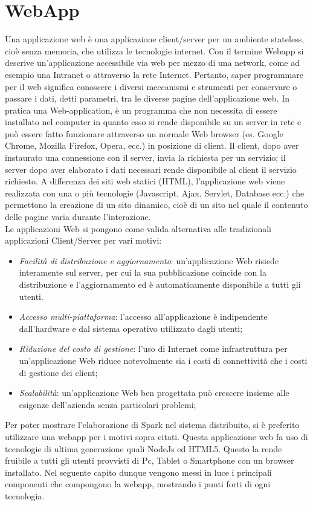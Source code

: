 \section{WebApp}
\label{sec:webapp}
Una applicazione web è una applicazione client/server per un ambiente stateless, cioè senza memoria, che utilizza le tecnologie internet. Con il termine Webapp si descrive un'applicazione accessibile via web per mezzo di una network, come ad esempio una Intranet o attraverso la rete Internet. Pertanto, saper programmare per il web significa conoscere i diversi meccanismi e strumenti per conservare o passare i dati, detti parametri, tra le diverse pagine dell'applicazione web. In pratica una Web-application, è un programma che non necessita di essere installato nel computer in quanto esso si rende disponibile su un server in rete e può essere fatto funzionare attraverso un normale Web browser (es. Google Chrome, Mozilla Firefox, Opera, ecc.) in posizione di client. Il client, dopo aver instaurato una connessione con il server, invia la richiesta per un servizio; il server dopo aver elaborato i dati necessari rende disponibile al client il servizio richiesto. A differenza dei siti web statici (HTML), l'applicazione web viene realizzata con una o più tecnologie (Javascript, Ajax, Servlet, Database ecc.) che permettono la creazione di un sito dinamico, cioè di un sito nel quale il contenuto delle pagine varia durante l'interazione.
\\Le applicazioni Web si pongono come valida alternativa alle tradizionali applicazioni Client/Server per vari motivi:
\begin{itemize}
\item \textit{Facilità di distribuzione e aggiornamento}: un'applicazione Web risiede interamente sul server, per cui la sua pubblicazione coincide con la distribuzione e l'aggiornamento ed è automaticamente disponibile a tutti gli utenti.
\item \textit{Accesso multi-piattaforma}: l'accesso all'applicazione è indipendente dall'hardware e dal sistema operativo utilizzato dagli utenti;
\item \textit{Riduzione del costo di gestione}: l'uso di Internet come infrastruttura per un'applicazione Web riduce notevolmente sia i costi di connettività che i costi di gestione dei client;
\item \textit{Scalabilità}: un'applicazione Web ben progettata può crescere insieme alle esigenze dell'azienda senza particolari problemi;
\end{itemize}
Per poter mostrare l'elaborazione di Spark nel sistema distribuito, si è preferito utilizzare una webapp per i motivi sopra citati. Questa applicazione web fa uso di tecnologie di ultima generazione quali NodeJs ed HTML5. Questo la rende fruibile a tutti gli utenti provvisti di Pc, Tablet o Smartphone con un browser installato. Nel seguente capito dunque vengono messi in luce i principali componenti che compongono la webapp, mostrando i punti forti di ogni tecnologia.
